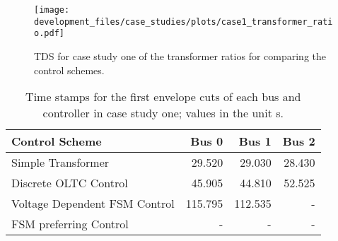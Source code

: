 \begin{figure}[htbp!]
    \centering
    \texttt{[image: development\_files/case\_studies/plots/case1\_transformer\_ratio.pdf]}
    \caption[\acs{TDS} for case study one of the transformer ratios for comparing the control schemes]{\acs{TDS} for case study one of the transformer ratios for comparing the control schemes.}
    \label{fig:case1-trans-ratio}
\end{figure}

\begin{table}[htbp!]
    \caption[Time stamps for the first envelope cuts of each bus and controller in case study one]{Time stamps for the first envelope cuts of each bus and controller in case study one; values in the unit s.}
    \label{tab:case1-critical-times}
    \vspace*{12pt}
    \centering
    \small
    \begin{tabularx}{\textwidth}{Xrrr}
        \textbf{Control Scheme} & \textbf{Bus 0} & \textbf{Bus 1} & \textbf{Bus 2} \\ \hline
        \toprule
        Simple Transformer                  & 29.520 & 29.030 & 28.430 \\
        Discrete \acs{OLTC} Control         & 45.905 & 44.810 & 52.525 \\
        Voltage Dependent \acs{FSM} Control & 115.795 & 112.535 & - \\
        \acs{FSM} preferring Control        & - & - & -  \\
        \bottomrule
    \end{tabularx}
\end{table}



